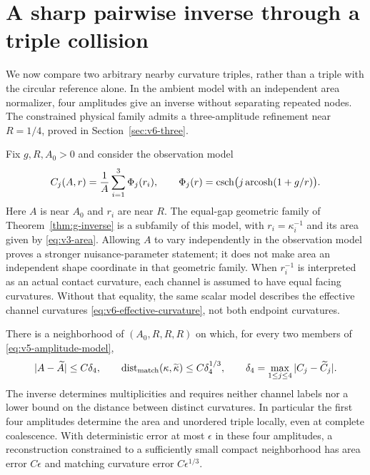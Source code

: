\section{A sharp pairwise inverse through a triple collision}
\label{sec:v5-pairwise}
We now compare two arbitrary nearby curvature triples, rather than a
triple with the circular reference alone. In the ambient model with an independent area normalizer, four
amplitudes give an inverse without separating repeated nodes. The
constrained physical family admits a three-amplitude refinement near
$R=1/4$, proved in Section~\ref{sec:v6-three}.

Fix $g,R,A_0>0$ and consider the observation model
\begin{equation}\label{eq:v5-amplitude-model}
 C_j(A,r)=\frac1A\sum_{i=1}^3\Phi_j(r_i),\qquad
 \Phi_j(r)=\operatorname{csch}\bigl(j\operatorname{arcosh}(1+g/r)\bigr).
\end{equation}
Here $A$ is near $A_0$ and $r_i$ are near $R$. The equal-gap geometric
family of Theorem~\ref{thm:g-inverse} is a subfamily of this model, with
$r_i=\kappa_i^{-1}$ and its area given by \eqref{eq:v3-area}. Allowing
$A$ to vary independently in the observation model proves a stronger
nuisance-parameter statement; it does not make area an independent
shape coordinate in that geometric family. When $r_i^{-1}$ is
interpreted as an actual contact curvature, each channel is assumed to
have equal facing curvatures. Without that equality, the same scalar
model describes the effective channel curvatures
\eqref{eq:v6-effective-curvature}, not both endpoint curvatures.

\begin{theorem}\label{thm:v5-pairwise}
There is a neighborhood of $(A_0,R,R,R)$ on which, for every two
members of \eqref{eq:v5-amplitude-model},
\begin{equation}\label{eq:v5-pairwise-bound}
 |A-\widetilde A|\le C\delta_4,\qquad
 \operatorname{dist}_{\rm match}(\kappa,\widetilde\kappa)
                         \le C\delta_4^{1/3},\qquad
 \delta_4=\max_{1\le j\le4}|C_j-\widetilde C_j|.
\end{equation}
The inverse determines multiplicities and requires neither channel
labels nor a lower bound on the distance between distinct curvatures.
In particular the first four amplitudes determine the area and unordered
triple locally, even at complete coalescence. With deterministic error
at most $\epsilon$ in these four amplitudes, a reconstruction constrained
to a sufficiently small compact neighborhood has area error $C\epsilon$
and matching curvature error $C\epsilon^{1/3}$.
\end{theorem}

